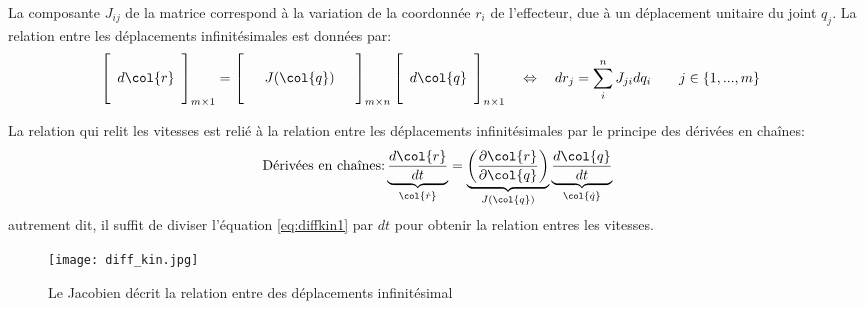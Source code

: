 La composante $J_{ij}$ de la matrice correspond à la variation de la coordonnée $r_i$ de l'effecteur, due à un déplacement unitaire du joint $q_j$. La relation entre les déplacements infinitésimales est données par:
\begin{align}
\left[ \begin{array}{c}  \\ d\col{r} \\ \\
\end{array} \right]_{m \times 1}
&= 
\left[ \begin{array}{c c c} 
&&\\
& J(\col{q}) &\\
&&
\end{array} \right]_{m \times n}
\left[ \begin{array}{c} 
\\ d\col{q} \\ \\
\end{array} \right]_{n \times 1}
\quad \Leftrightarrow \quad
dr_j
= \sum_i^n{
J_{ji} 
dq_i
}
\quad \quad j \in \left\{ 1 , ... , m \right\}
\label{eq:diffkin1}
\end{align}


La relation qui relit les vitesses est relié à la relation entre les déplacements infinitésimales par le principe des dérivées en chaînes:
\begin{equation}
\text{Dérivées en chaînes:} 
\underbrace{
\frac{d \col{r}}{dt}
}_{\col{\dot{r}}}
= 
\underbrace{
\left( \frac{\partial \col{r}}{\partial \col{q}} \right)
}_{J(\col{q})}
\underbrace{
\frac{d \col{q}}{dt}
}_{\col{\dot{q}}}
\end{equation}
autrement dit, il suffit de diviser l'équation \eqref{eq:diffkin1} par $dt$ pour obtenir la relation entres les vitesses. 

\begin{figure}[H]
	\centering
		\texttt{[image: diff\_kin.jpg]}
	\caption{Le Jacobien décrit la relation entre des déplacements infinitésimal}
	\label{fig:diff_kin_variation}
\end{figure}

